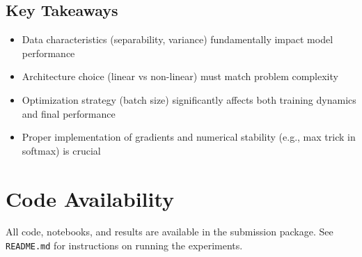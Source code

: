 \documentclass[11pt,a4paper]{article}
\begin{document}
\subsection{Key Takeaways}
\begin{itemize}
    \item Data characteristics (separability, variance) fundamentally impact model performance
    \item Architecture choice (linear vs non-linear) must match problem complexity
    \item Optimization strategy (batch size) significantly affects both training dynamics and final performance
    \item Proper implementation of gradients and numerical stability (e.g., max trick in softmax) is crucial
\end{itemize}

\section*{Code Availability}
All code, notebooks, and results are available in the submission package. See \texttt{README.md} for instructions on running the experiments.
\end{document}
